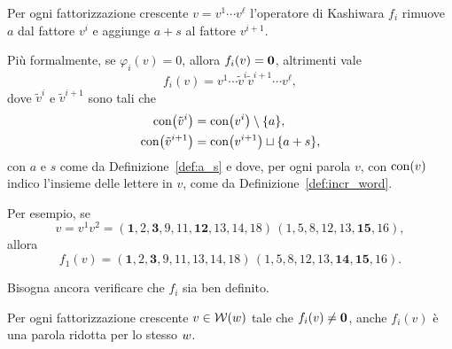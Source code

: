 \begin{definition}
    Per ogni fattorizzazione crescente $v = v^1 \cdots v^\ell$ l'operatore di 
    Kashiwara $f_i$ rimuove $a$ dal fattore $v^i$ e aggiunge $a+s$ al fattore $v^{i+1}$.

    Pi\`u formalmente,  se $\varphi_i (v) = 0$, allora $f_i (v) = \mathbf{0}$, altrimenti vale
    \[
        f_i (v) = v^1 \cdots \tilde{v}^i \tilde{v}^{i+1} \cdots v^\ell,
    \]
    dove $\tilde{v}^i$ e $ \tilde{v}^{i+1} $ sono tali che 
    \begin{align*}
        \operatorname{con} \bigl( \tilde{v}^i \bigr) &= \operatorname{con} \bigl(v^i\bigr) \setminus \{ a \}, \\
        \operatorname{con} \bigl( \tilde{v}^{i+1}\bigr) &= \operatorname{con} \bigl(v^{i+1}\bigr) \sqcup \{ a + s \},
    \end{align*}
    con $a$ e $s$ come da Definizione~\ref{def:a_s} e dove, per ogni parola
    $v$, con $\operatorname{con}(v)$ indico l'insieme delle lettere in $v$,
    come da Definizione~\ref{def:incr_word}.
\end{definition}

\begin{example}
    \label{ex:f_agisce_su_incrfact}
    Per esempio, se
    \[
        v = v^1  v^2 = 
        ( \mathbf{1}, 2, \mathbf{3}, 9, 11, \mathbf{12}, 13, 14, 18 ) \,
        ( 1, 5, 8, 12, 13, \mathbf{15}, 16),
    \]
    allora
    \[
        f_1 (v) = 
        ( \mathbf{1}, 2, \mathbf{3}, 9, 11, 13, 14, 18 ) \,
        ( 1, 5, 8, 12, 13, \mathbf{14}, \mathbf{15}, 16).
    \]


\end{example}

Bisogna ancora verificare che $f_i$ sia ben definito.

\begin{proposition}
    \label{prop:ms_f_coxeter_equivalenza}
    Per ogni fattorizzazione crescente $v \in \operatorname{\mathcal{W}}(w)$ tale che $f_i (v) \neq \mathbf{0} $, 
    anche $f_i (v)$ \`e una parola ridotta per lo stesso $w$.
\end{proposition}

